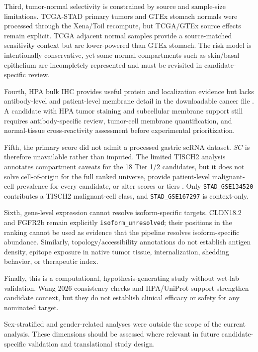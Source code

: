 \documentclass[review,12pt,authoryear]{elsarticle}
\begin{document}
Third, tumor-normal selectivity is constrained by source and sample-size limitations. TCGA-STAD primary tumors and GTEx stomach normals were processed through the Xena/\allowbreak{}Toil recompute, but TCGA/\allowbreak{}GTEx source effects remain explicit. TCGA adjacent normal samples provide a source-matched sensitivity context but are lower-powered than GTEx stomach. The risk model is intentionally conservative, yet some normal compartments such as skin/\allowbreak{}basal epithelium are incompletely represented and must be revisited in candidate-specific review.

Fourth, HPA bulk IHC provides useful protein and localization evidence but lacks antibody-level and patient-level membrane detail in the downloadable cancer file \citep{uhlen2015hpa,uhlen2017pathology,thul2017subcellular}. A candidate with HPA tumor staining and subcellular membrane support still requires antibody-specific review, tumor-cell membrane quantification, and normal-tissue cross-reactivity assessment before experimental prioritization.

Fifth, the primary score did not admit a processed gastric scRNA dataset. $SC$ is therefore unavailable rather than imputed. The limited TISCH2 analysis annotates compartment caveats for the 18 Tier 1/\allowbreak{}2 candidates, but it does not solve cell-of-origin for the full ranked universe, provide patient-level malignant-cell prevalence for every candidate, or alter scores or tiers \citep{han2023tisch2,zhang2019gastric_scrna,jeong2021gastric_tme}. Only \texttt{STAD\_\allowbreak{}GSE134520} contributes a TISCH2 malignant-cell class, and \texttt{STAD\_\allowbreak{}GSE167297} is context-only.

Sixth, gene-level expression cannot resolve isoform-specific targets. CLDN18.2 and FGFR2b remain explicitly \texttt{isoform\_\allowbreak{}unresolved};\allowbreak{} their positions in the ranking cannot be used as evidence that the pipeline resolves isoform-specific abundance. Similarly, topology/\allowbreak{}accessibility annotations do not establish antigen density, epitope exposure in native tumor tissue, internalization, shedding behavior, or therapeutic index.

Finally, this is a computational, hypothesis-generating study without wet-lab validation. Wang 2026 consistency checks and HPA/\allowbreak{}UniProt support strengthen candidate context, but they do not establish clinical efficacy or safety for any nominated target.

Sex-stratified and gender-related analyses were outside the scope of the current analysis. These dimensions should be assessed where relevant in future candidate-specific validation and translational study design.
\end{document}

